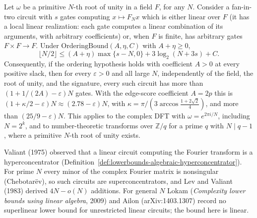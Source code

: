 \begin{theorem}
  \label{thm:lowerbounds-algebraic-dft}
  \leanok
  Let $\omega$ be a primitive $N$-th root of unity in a field $F$, for any $N$. Consider a
  fan-in-two circuit with $s$ gates computing $x\mapsto F_Nx$ which is either linear over $F$
  (it has a local linear realization: each gate computes a linear combination of its arguments,
  with arbitrary coefficients) or, when $F$ is finite, has arbitrary gates $F\times F\to F$.
  Under $\mathrm{OrderingBound}(A,\eta,C)$ with $A+\eta\ge0$,
  \[
    \lfloor N/2\rfloor\le(A+\eta)\max\{s-N,0\}+3\log_2(N+3s)+C .
  \]
  Consequently, if the ordering hypothesis holds with coefficient $A>0$ at every positive slack,
  then for every $\varepsilon>0$ and all large $N$, independently of the field, the root of
  unity, and the signature, every such circuit has more than $(1+1/(2A)-\varepsilon)N$ gates.
  With the edge-score coefficient $A=2p$ this is
  $(1+\kappa/2-\varepsilon)N\approx(2.78-\varepsilon)N$, with
  $\kappa=\pi/(3\arccos\tfrac{1+2\sqrt2}{4})$, and more than $(25/9-\varepsilon)N$. This applies
  to the complex DFT with $\omega=e^{2\pi i/N}$, including $N=2^k$, and to number-theoretic
  transforms over $\mathbb{Z}/q$ for a prime $q$ with $N\mid q-1$, where a primitive $N$-th root
  of unity exists.

  Valiant (1975) observed that a linear circuit computing the Fourier transform is a
  hyperconcentrator (Definition~\ref{def:lowerbounds-algebraic-hyperconcentrator}). For prime
  $N$ every minor of the complex Fourier matrix is nonsingular (Chebotar\"ev), so such circuits
  are superconcentrators, and Lev and Valiant (1983) derived $4N-o(N)$ additions. For general $N$
  Lokam (\emph{Complexity lower bounds using linear algebra}, 2009) and Ailon (arXiv:1403.1307)
  record no superlinear lower bound for unrestricted linear circuits; the bound here is linear.
\end{theorem}
